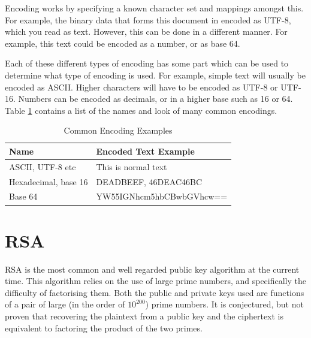 				Encoding works by specifying a known character set and mappings amongst this. 
				For example, the binary data that forms this document in encoded as UTF-8, which you read as text. 
				However, this can be done in a different manner. 
				For example, this text could be encoded as a number, or as base 64. 

				Each of these different types of encoding has some part which can be used to determine what type of encoding is used. 
				For example, simple text will usually be encoded as ASCII. 
				Higher characters will have to be encoded as UTF-8 or UTF-16. 
				Numbers can be encoded as decimals, or in a higher base such as 16 or 64. 
				Table \ref{tab:Encodings} contains a list of the names and look of many common encodings. 
				\begin{table}[htb]
					\centering
				\begin{adjustbox}{max width=1\textwidth}
					\begin{tabular}{| l | l |}
						\hline
						\textbf{Name} & \textbf{Encoded Text Example} \\ \hline
						ASCII, UTF-8 etc & This is normal text \\ \hline
						Hexadecimal, base 16 & DEADBEEF, 46DEAC46BC \\ \hline
						Base 64 & YW55IGNhcm5hbCBwbGVhcw== \\ \hline
					\end{tabular}
				\end{adjustbox}
					\caption{Common Encoding Examples}
					\label{tab:Encodings}
				\end{table}
	\section{RSA}
		RSA is the most common and well regarded public key algorithm at the current time. 
		This algorithm relies on the use of large prime numbers, and specifically the difficulty of factorising them. 
		Both the public and private keys used are functions of a pair of large (in the order of $10^{200}$) prime numbers. 
		It is conjectured, but not proven that recovering the plaintext from a public key and the ciphertext is equivalent to factoring the product of the two primes. 

